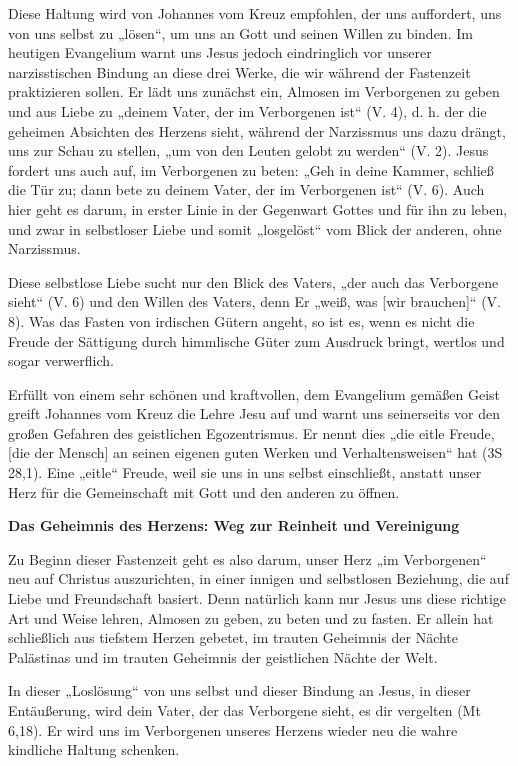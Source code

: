 \documentclass[A4paper,14pt]{extarticle}
\newcommand{\hTwo}[1]{%
  \needspace{3\baselineskip}%
  {\sffamily\bfseries\large\color{karmelviolett}#1\par}%
}
\begin{document}
Diese Haltung wird von Johannes vom Kreuz empfohlen, der uns auffordert, uns von uns selbst zu „lösen“, um uns an Gott und seinen Willen zu binden.
Im heutigen Evangelium warnt uns Jesus jedoch eindringlich vor unserer narzisstischen Bindung an diese drei Werke, die wir während der Fastenzeit praktizieren sollen. Er lädt uns zunächst ein, Almosen im Verborgenen zu geben und aus Liebe zu „deinem Vater, der im Verborgenen ist“ (V. 4), d. h. der die geheimen Absichten des Herzens sieht, während der Narzissmus uns dazu drängt, uns zur Schau zu stellen, „um von den Leuten gelobt zu werden“ (V. 2). Jesus fordert uns auch auf, im Verborgenen zu beten: „Geh in deine Kammer, schließ die Tür zu; dann bete zu deinem Vater, der im Verborgenen ist“ (V. 6). Auch hier geht es darum, in erster Linie in der Gegenwart Gottes und für ihn zu leben, und zwar in selbstloser Liebe und somit „losgelöst“ vom Blick der anderen, ohne Narzissmus.

Diese selbstlose Liebe sucht nur den Blick des Vaters, „der auch das Verborgene sieht“ (V. 6) und den Willen des Vaters, denn Er „weiß, was [wir brauchen]“ (V. 8). Was das Fasten von irdischen Gütern angeht, so ist es, wenn es nicht die Freude der Sättigung durch himmlische Güter zum Ausdruck bringt, wertlos und sogar verwerflich.

Erfüllt von einem sehr schönen und kraftvollen, dem Evangelium gemäßen Geist greift Johannes vom Kreuz die Lehre Jesu auf und warnt uns seinerseits vor den großen Gefahren des geistlichen Egozentrismus. Er nennt dies „die eitle Freude, [die der Mensch] an seinen eigenen guten Werken und Verhaltensweisen“ hat (3S 28,1). Eine „eitle“ Freude, weil sie uns in uns selbst einschließt, anstatt unser Herz für die Gemeinschaft mit Gott und den anderen zu öffnen.
\hTwo{Das Geheimnis des Herzens: Weg zur Reinheit und Vereinigung}

Zu Beginn dieser Fastenzeit geht es also darum, unser Herz „im Verborgenen“ neu auf Christus auszurichten, in einer innigen und selbstlosen Beziehung, die auf Liebe und Freundschaft basiert. Denn natürlich kann nur Jesus uns diese richtige Art und Weise lehren, Almosen zu geben, zu beten und zu fasten. Er allein hat schließlich aus tiefstem Herzen gebetet, im trauten Geheimnis der Nächte Palästinas und im trauten Geheimnis der geistlichen Nächte der Welt.

In dieser „Loslösung“ von uns selbst und dieser Bindung an Jesus, in dieser Entäußerung, wird dein Vater, der das Verborgene sieht, es dir vergelten (Mt 6,18). Er wird uns im Verborgenen unseres Herzens wieder neu die wahre kindliche Haltung schenken.
\end{document}
